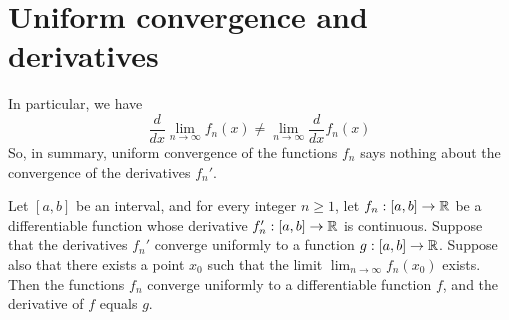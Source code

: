 \section{Uniform convergence and derivatives}\label{ii:sec:3.7}

\begin{note}
  In particular, we have
  \[
    \dfrac{d}{dx} \lim_{n \to \infty} f_n(x) \neq \lim_{n \to \infty} \dfrac{d}{dx} f_n(x)
  \]
  So, in summary, uniform convergence of the functions \(f_n\) says nothing about the convergence of the derivatives \(f_n'\).
\end{note}

\begin{thm}\label{ii:3.7.1}
  Let \([a, b]\) be an interval, and for every integer \(n \geq 1\), let \(f_n : [a, b] \to \mathbb{R}\) be a differentiable function whose derivative \(f_n' : [a, b] \to \mathbb{R}\) is continuous.
  Suppose that the derivatives \(f_n'\) converge uniformly to a function \(g : [a, b] \to \mathbb{R}\).
  Suppose also that there exists a point \(x_0\) such that the limit \(\lim_{n \to \infty} f_n(x_0)\) exists.
  Then the functions \(f_n\) converge uniformly to a differentiable function \(f\), and the derivative of \(f\) equals \(g\).
\end{thm}

